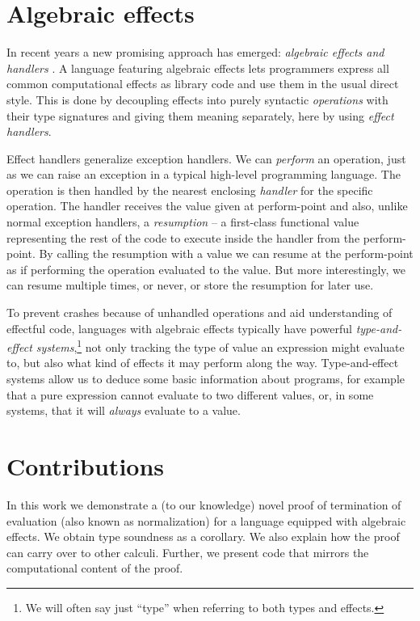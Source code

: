 \documentclass[a4paper, 11pt,titlepage, openright, twoside]{report}
\newcommand{\+}{\enspace}
\begin{document}
\section{Algebraic effects}

In recent years a new promising approach has emerged: \textit{algebraic effects and handlers} \cite{Plotkin_2013}.
A language featuring algebraic effects lets programmers express all common computational effects as library code
and use them in the usual direct style.
This is done by decoupling effects into purely syntactic {\em operations} with their type signatures
and giving them meaning separately, here by using {\em effect handlers}.

Effect handlers generalize exception handlers.
We can \textit{perform} an operation,
just as we can raise an exception in a typical high-level programming language.
The operation is then handled by the nearest enclosing \textit{handler} for the specific operation.
The handler receives the value given at perform-point and also,
unlike normal exception handlers,
a \textit{resumption} – a first-class functional value representing the rest
of the code to execute inside the handler from the perform-point.
By calling the resumption with a value we can resume at the perform-point
as if performing the operation evaluated to the value.
But more interestingly, we can resume multiple times, or never, or store the resumption for later use.

To prevent crashes because of unhandled operations and aid understanding of effectful code,
languages with algebraic effects typically have powerful
\textit{type-and-effect systems},\footnote{
We will often say just ``type'' when referring to both types and effects.}
not only tracking the type of value an expression might evaluate to, but also
what kind of effects it may perform along the way.
Type-and-effect systems allow us to deduce some basic information about programs,
for example that a pure expression cannot evaluate to two different values,
or, in some systems, that it will {\em always} evaluate to a value.

\section{Contributions}

In this work we demonstrate a (to our knowledge) novel proof of
termination of evaluation (also known as normalization) for a
language \cite{fscd19} equipped with algebraic effects.
We obtain type soundness as a corollary.
We also explain how the proof can carry over to other calculi.
Further, we present code that mirrors the computational content of the proof.
\end{document}
